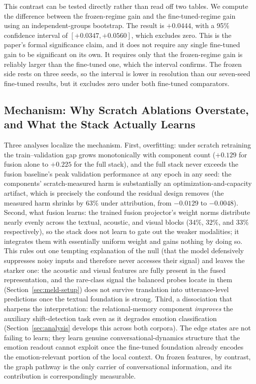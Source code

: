 This contrast can be tested directly rather than read off two tables. We compute the difference between the frozen-regime gain and the fine-tuned-regime gain using an independent-groups bootstrap. The result is $+0.0444$, with a 95\% confidence interval of $[+0.0347, +0.0560]$, which excludes zero. This is the paper's formal significance claim, and it does not require any single fine-tuned gain to be significant on its own. It requires only that the frozen-regime gain is reliably larger than the fine-tuned one, which the interval confirms. The frozen side rests on three seeds, so the interval is lower in resolution than our seven-seed fine-tuned results, but it excludes zero under both fine-tuned comparators.



\subsection{Mechanism: Why Scratch Ablations Overstate, and What the Stack Actually Learns}
\label{sec:meld-mechanism}

Three analyses localize the mechanism. First, overfitting: under scratch retraining the train--validation gap grows monotonically with component count ($+0.129$ for fusion alone to $+0.225$ for the full stack), and the full stack never exceeds the fusion baseline's peak validation performance at any epoch in any seed: the components' scratch-measured harm is substantially an optimization-and-capacity artifact, which is precisely the confound the residual design removes (the measured harm shrinks by $63\%$ under attribution, from $-0.0129$ to $-0.0048$). Second, what fusion learns: the trained fusion projector's weight norms distribute nearly evenly across the textual, acoustic, and visual blocks ($34\%$, $32\%$, and $33\%$ respectively), so the stack does not learn to gate out the weaker modalities; it integrates them with essentially uniform weight and gains nothing by doing so. This rules out one tempting explanation of the null (that the model defensively suppresses noisy inputs and therefore never accesses their signal) and leaves the starker one: the acoustic and visual features are fully present in the fused representation, and the rare-class signal the balanced probes locate in them (Section~\ref{sec:meld-setup}) does not survive translation into utterance-level predictions once the textual foundation is strong. Third, a dissociation that sharpens the interpretation: the relational-memory component \textit{improves} the auxiliary shift-detection task even as it degrades emotion classification (Section~\ref{sec:analysis} develops this across both corpora). The edge states are not failing to learn; they learn genuine conversational-dynamics structure that the emotion readout cannot exploit once the fine-tuned foundation already encodes the emotion-relevant portion of the local context. On frozen features, by contrast, the graph pathway is the only carrier of conversational information, and its contribution is correspondingly measurable.

